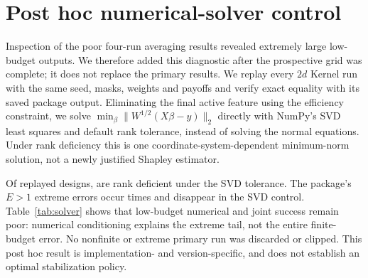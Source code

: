 \begin{table}[t]
\centering\small

\caption{Joint success (percent, 95\% case-bootstrap intervals), averaged equally over fitted models. Difference is four-run averaging minus a single larger run, with a paired case bootstrap. Endpoints and saturation prevent exact equality of total costs.}
\label{tab:averaging}
\end{table}

\section{Post hoc numerical-solver control}
\label{app:solver}
Inspection of the poor four-run averaging results revealed extremely large low-budget outputs. We therefore added this diagnostic after the prospective grid was complete; it does not replace the primary results. We replay every $2d$ Kernel run with the same seed, masks, weights and payoffs and verify exact equality with its saved package output. Eliminating the final active feature using the efficiency constraint, we solve $\min_\beta\|W^{1/2}(X\beta-y)\|_2$ directly with NumPy's SVD least squares and default rank tolerance, instead of solving the normal equations. Under rank deficiency this is one coordinate-system-dependent minimum-norm solution, not a newly justified Shapley estimator.

Of \SolverRuns{} replayed designs, \DeficientDesigns{} are rank deficient under the SVD tolerance. The package's $E>1$ extreme errors occur \ExtremePackage{} times and disappear in the SVD control. Table~\ref{tab:solver} shows that low-budget numerical and joint success remain poor: numerical conditioning explains the extreme tail, not the entire finite-budget error. No nonfinite or extreme primary run was discarded or clipped. This post hoc result is implementation- and version-specific, and does not establish an optimal stabilization policy.

\begin{table}[t]
\centering\small

\caption{Post hoc $2d$ solver control with identical sampled payoffs. Percent, with 95\% matched-case bootstrap intervals, averaging the three fixed models in each dataset. $E>1$ denotes maximum attribution error exceeding one probability unit. SVD removes extreme outputs but does not make the lowest budget accurate.}
\label{tab:solver}
\end{table}

